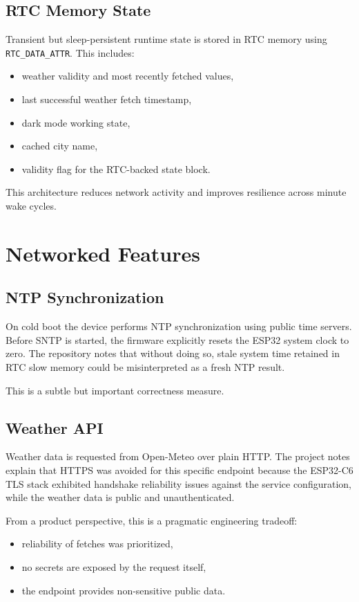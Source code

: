 \documentclass[11pt]{article}
\begin{document}
\subsection{RTC Memory State}
Transient but sleep-persistent runtime state is stored in RTC memory using \texttt{RTC\_DATA\_ATTR}. This includes:
\begin{itemize}
  \item weather validity and most recently fetched values,
  \item last successful weather fetch timestamp,
  \item dark mode working state,
  \item cached city name,
  \item validity flag for the RTC-backed state block.
\end{itemize}

This architecture reduces network activity and improves resilience across minute wake cycles.

\section{Networked Features}
\subsection{NTP Synchronization}
On cold boot the device performs NTP synchronization using public time servers. Before SNTP is started, the firmware explicitly resets the ESP32 system clock to zero. The repository notes that without doing so, stale system time retained in RTC slow memory could be misinterpreted as a fresh NTP result.

This is a subtle but important correctness measure.

\subsection{Weather API}
Weather data is requested from Open-Meteo over plain HTTP. The project notes explain that HTTPS was avoided for this specific endpoint because the ESP32-C6 TLS stack exhibited handshake reliability issues against the service configuration, while the weather data is public and unauthenticated.

From a product perspective, this is a pragmatic engineering tradeoff:
\begin{itemize}
  \item reliability of fetches was prioritized,
  \item no secrets are exposed by the request itself,
  \item the endpoint provides non-sensitive public data.
\end{itemize}
\end{document}
